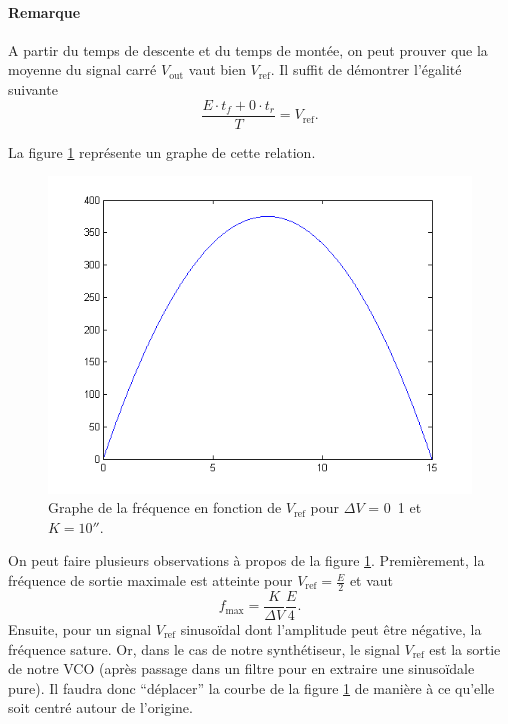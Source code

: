 \paragraph{Remarque}
A partir du temps de descente et du temps de montée, on
peut prouver que la moyenne du signal carré $V_{\text{out}}$
vaut bien $V_{\text{ref}}$. Il suffit de démontrer l'égalité
suivante
\[ \frac{E \cdot t_f + 0 \cdot t_r}{T} = V_{\text{ref}}.\]

La figure \ref{fig:sigma-delta-f-vs-vref} représente un
graphe de cette relation.

\begin{figure}[ht]
	\centering
	\includegraphics[scale=0.6]{img/sigma-delta-f-vs-vref.png}
	\caption{Graphe de la fréquence en fonction de $V_{\text{ref}}$
	pour $\Delta V$ = \unit{0.1}{\volt} et $K = \unit{10}{\second}$.}
	\label{fig:sigma-delta-f-vs-vref}
\end{figure}

On peut faire plusieurs observations à propos de la figure
\ref{fig:sigma-delta-f-vs-vref}. Premièrement, la fréquence
de sortie maximale est atteinte pour $V_{\text{ref}} = \frac{E}{2}$
et vaut
\[ f_{\text{max}} = \frac{K}{\Delta V}\frac{E}{4}. \]
Ensuite, pour un signal $V_{\text{ref}}$ sinusoïdal dont
l'amplitude peut être négative, la fréquence sature.
Or, dans le cas de notre synthétiseur, le signal $V_{\text{ref}}$
est la sortie de notre VCO (après passage dans un filtre pour
en extraire une sinusoïdale pure).
Il faudra donc ``déplacer'' la courbe de la figure
\ref{fig:sigma-delta-f-vs-vref} de manière à ce qu'elle soit
centré autour de l'origine.

